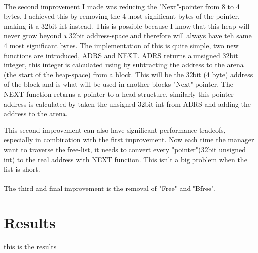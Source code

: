 \documentclass[11pt]{article}
\begin{document}
\paragraph{}
The second improvement I made was reducing the "Next"-pointer from 8 to 4 bytes. I achieved this by removing the 4 most significant bytes
of the pointer, making it a 32bit int instead. This is possible because I know that this heap will never grow beyond a 32bit address-space
and therefore will always have teh same 4 most significant bytes. The implementation of this is quite simple, two new functions are 
introduced, ADRS and NEXT. ADRS returns a unsigned 32bit integer, this integer is calculated using by subtracting the address to the arena
(the start of the heap-space) from a block. This will be the 32bit (4 byte) address of the block and is what will be used in another blocks
"Next"-pointer. The NEXT function returns a pointer to a head structure, similarly this pointer address is calculated by taken the 
unsigned 32bit int from ADRS and adding the address to the arena. 

This second improvement can also have significant performance tradeofs, especially in combination with the first improvement. Now each time
the manager want to traverse the free-list, it needs to convert every "pointer"(32bit unsigned int) to the real address with NEXT function.
This isn't a big problem when the list is short.

\paragraph{}
The third and final improvement is the removal of "Free" and "Bfree".

\section{Results}

this is the results
\end{document}
